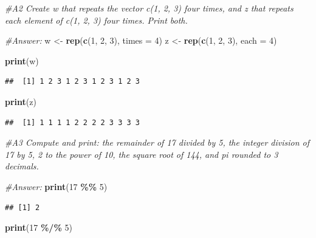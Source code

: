 \documentclass[
]{article}
\newenvironment{Shaded}{\begin{snugshade}}{\end{snugshade}}
\newcommand{\AttributeTok}[1]{\textcolor[rgb]{0.13,0.29,0.53}{#1}}
\newcommand{\CommentTok}[1]{\textcolor[rgb]{0.56,0.35,0.01}{\textit{#1}}}
\newcommand{\DecValTok}[1]{\textcolor[rgb]{0.00,0.00,0.81}{#1}}
\newcommand{\FunctionTok}[1]{\textcolor[rgb]{0.13,0.29,0.53}{\textbf{#1}}}
\newcommand{\NormalTok}[1]{#1}
\newcommand{\OtherTok}[1]{\textcolor[rgb]{0.56,0.35,0.01}{#1}}
\newcommand{\SpecialCharTok}[1]{\textcolor[rgb]{0.81,0.36,0.00}{\textbf{#1}}}
\begin{document}
\begin{Shaded}
\begin{Highlighting}[]
\CommentTok{\#A2 Create w that repeats the vector c(1, 2, 3) four times, and z that repeats each element of c(1, 2, 3) four times. Print both.}

\CommentTok{\#Answer: }
\NormalTok{w }\OtherTok{\textless{}{-}} \FunctionTok{rep}\NormalTok{(}\FunctionTok{c}\NormalTok{(}\DecValTok{1}\NormalTok{, }\DecValTok{2}\NormalTok{, }\DecValTok{3}\NormalTok{), }\AttributeTok{times =} \DecValTok{4}\NormalTok{)}
\NormalTok{z }\OtherTok{\textless{}{-}} \FunctionTok{rep}\NormalTok{(}\FunctionTok{c}\NormalTok{(}\DecValTok{1}\NormalTok{, }\DecValTok{2}\NormalTok{, }\DecValTok{3}\NormalTok{), }\AttributeTok{each =} \DecValTok{4}\NormalTok{)}

\FunctionTok{print}\NormalTok{(w)}
\end{Highlighting}
\end{Shaded}

\begin{verbatim}
##  [1] 1 2 3 1 2 3 1 2 3 1 2 3
\end{verbatim}

\begin{Shaded}
\begin{Highlighting}[]
\FunctionTok{print}\NormalTok{(z)}
\end{Highlighting}
\end{Shaded}

\begin{verbatim}
##  [1] 1 1 1 1 2 2 2 2 3 3 3 3
\end{verbatim}

\begin{Shaded}
\begin{Highlighting}[]
\CommentTok{\#A3 Compute and print: the remainder of 17 divided by 5, the integer division of 17 by 5, 2 to the power of 10, the square root of 144, and pi rounded to 3 decimals.}

\CommentTok{\#Answer:}
\FunctionTok{print}\NormalTok{(}\DecValTok{17} \SpecialCharTok{\%\%} \DecValTok{5}\NormalTok{)}
\end{Highlighting}
\end{Shaded}

\begin{verbatim}
## [1] 2
\end{verbatim}

\begin{Shaded}
\begin{Highlighting}[]
\FunctionTok{print}\NormalTok{(}\DecValTok{17} \SpecialCharTok{\%/\%} \DecValTok{5}\NormalTok{)}
\end{Highlighting}
\end{Shaded}
\end{document}

